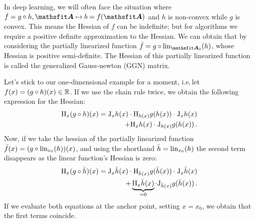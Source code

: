 In deep learning, we will often face the situation where $f = g \circ h, \tA \mapsto b = f(\tA)$ and $h$ is non-convex while $g$ is convex.
This means the Hessian of $f$ can be indefinite; but for algorithms we require a positive definite approximation to the Hessian.
We can obtain that by considering the partially linearized function $\bar{f} = g \circ \lin_{\tA_0}(h)$, whose Hessian is positive semi-definite. The Hessian of this partially linearized function is called the generalized Gauss-newton (GGN) matrix.

Let's stick to our one-dimensional example for a moment, i.e.\,let $f(x) = (g \circ h)(x) \in {\mathbb{R}}$. If we use the chain rule twice, we obtain the following expression for the Hessian:
\begin{align*}
  \mathrm{H}_x (g \circ h)(x) =
  \mathrm{J}_x h(x) \cdot \mathrm{H}_{h(x)} g(h(x)) \cdot \mathrm{J}_x h(x)
  \\
  +
  \mathrm{H}_x h(x) \cdot \mathrm{J}_{h(x)} g(h(x))\,.
\end{align*}
Now, if we take the hessian of the partially linearized function $\bar{f}(x) = (g \circ \operatorname{lin}_{x_0}(h))(x)$, and using the shorthand $\bar{h} = \operatorname{lin}_{x_0}(h)$ the second term disappears as the linear function's Hessian is zero:
\begin{align*}
  \mathrm{H}_x (g \circ \bar{h})(x) =
  \mathrm{J}_x \bar{h}(x) \cdot \mathrm{H}_{\bar{h}(x)} g(\bar{h}(x)) \cdot \mathrm{J}_x \bar{h}(x)
  \\
  +
  \underbrace{\mathrm{H}_x \bar{h}(x)}_{= 0} \cdot \mathrm{J}_{\bar{h}(x)} g(\bar{h}(x))\,.
\end{align*}
If we evaluate both equations at the anchor point, setting $x = x_0$, we obtain that the first terms coincide.

